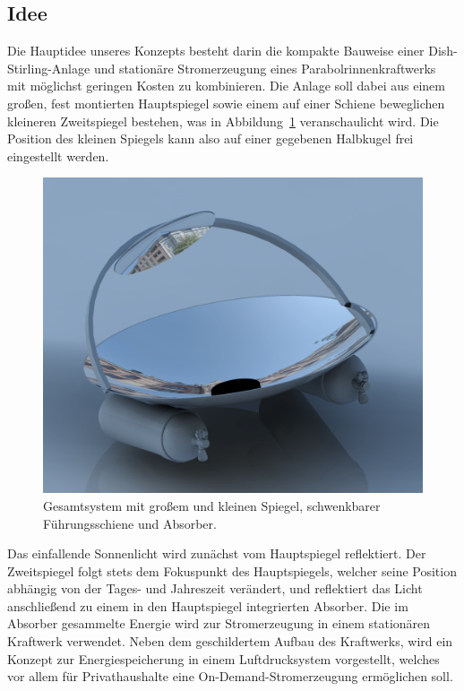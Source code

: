 \documentclass[fontsize=10pt,paper=a4,bibliography=totoc]{scrartcl}
\begin{document}
\subsection{Idee}
Die Hauptidee unseres Konzepts besteht darin die kompakte Bauweise einer Dish-Stirling-Anlage und stationäre Stromerzeugung eines Parabolrinnenkraftwerks mit möglichst geringen Kosten zu kombinieren. Die Anlage soll dabei aus einem großen, fest montierten Hauptspiegel sowie einem auf einer Schiene beweglichen kleineren Zweitspiegel bestehen, was in Abbildung~\ref{pic:system_rendered} veranschaulicht wird. Die Position des kleinen Spiegels kann also auf einer gegebenen Halbkugel frei eingestellt werden.
\begin{figure}[htb]
	\centering
	\includegraphics[width=\textwidth]{images/SMALL_MIRROR}
	\caption[Gesamtsystem]{Gesamtsystem mit großem und kleinen Spiegel, schwenkbarer Führungsschiene und Absorber.}
	\label{pic:system_rendered}
\end{figure}
Das einfallende Sonnenlicht wird zunächst vom Hauptspiegel reflektiert. Der Zweitspiegel folgt stets dem Fokuspunkt des Hauptspiegels, welcher seine Position abhängig von der Tages- und Jahreszeit verändert, und reflektiert das Licht anschließend zu einem in den Hauptspiegel integrierten Absorber.  Die im Absorber gesammelte Energie wird zur Stromerzeugung in einem stationären Kraftwerk verwendet.
Neben dem geschildertem Aufbau des Kraftwerks, wird ein Konzept zur Energiespeicherung in einem Luftdrucksystem vorgestellt, welches vor allem für Privathaushalte eine On-Demand-Stromerzeugung ermöglichen soll.
\end{document}
